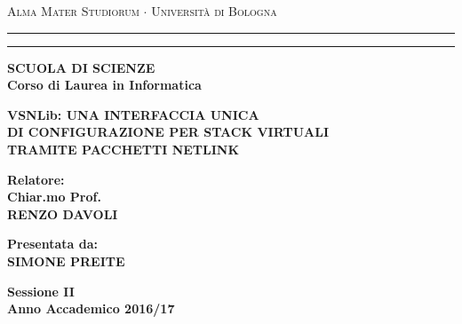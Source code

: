 \begin{titlepage}
\begin{center}
{{\Large{\textsc{Alma Mater Studiorum $\cdot$ Universit\`a di
Bologna}}}} \rule[0.1cm]{13.8cm}{0.1mm}
\rule[0.5cm]{13.8cm}{0.6mm}
{\bf SCUOLA DI SCIENZE\\
Corso di Laurea in Informatica }
\end{center}
\vspace{25mm}
\begin{center}
  {\large{\bf VSNLib: UNA INTERFACCIA UNICA}}\\
  \vspace{2mm}
  {\large{\bf DI CONFIGURAZIONE PER STACK VIRTUALI}}\\
  \vspace{2mm}
  {\large{\bf TRAMITE PACCHETTI NETLINK}}\\
  \end{center}
  \vspace{30mm}
  \par
  \noindent
  \begin{minipage}[t]{0.5\textwidth}
  {\large{\bf Relatore:\\
  Chiar.mo Prof.\\
  RENZO DAVOLI}}\\
  \end{minipage}
  \hfill
  \begin{minipage}[t]{0.5\textwidth}\raggedleft
  {\large{\bf Presentata da:\\
  SIMONE PREITE}}
\end{minipage}
\vspace{30mm}
\begin{center}
{\large{\bf Sessione II\\%
Anno Accademico 2016/17}}%
\end{center}
\end{titlepage}
